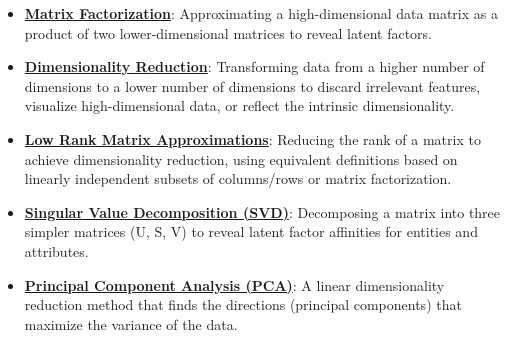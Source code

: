 \documentclass{article}%
\begin{document}
\begin{itemize}[leftmargin=*]%
\item \href{https://purdue.brightspace.com/d2l/common/assets/pdfjs-d2l-dist/1.0.14-legacy/web/viewer.html?file=\%2Fcontent\%2Fenforced\%2F1095467-wl.202510.CS.24300.001\%2F11L2-svd-pca-recommender.pdf\%3Fou\%3D1095467\&lang=en-us\&container=d2l-fileviewer-rendered-pdf\&fullscreen=d2l-fileviewer-rendered-pdf-dialog\&height=667#page=13}{\textbf{Matrix Factorization}}: Approximating a high-dimensional data matrix as a product of two lower-dimensional matrices to reveal latent factors.%
\item \href{https://purdue.brightspace.com/d2l/common/assets/pdfjs-d2l-dist/1.0.14-legacy/web/viewer.html?file=\%2Fcontent\%2Fenforced\%2F1095467-wl.202510.CS.24300.001\%2F11L2-svd-pca-recommender.pdf\%3Fou\%3D1095467\&lang=en-us\&container=d2l-fileviewer-rendered-pdf\&fullscreen=d2l-fileviewer-rendered-pdf-dialog\&height=667#page=8}{\textbf{Dimensionality Reduction}}: Transforming data from a higher number of dimensions to a lower number of dimensions to discard irrelevant features, visualize high-dimensional data, or reflect the intrinsic dimensionality.%
\item \href{https://purdue.brightspace.com/d2l/common/assets/pdfjs-d2l-dist/1.0.14-legacy/web/viewer.html?file=\%2Fcontent\%2Fenforced\%2F1095467-wl.202510.CS.24300.001\%2F11L2-svd-pca-recommender.pdf\%3Fou\%3D1095467\&lang=en-us\&container=d2l-fileviewer-rendered-pdf\&fullscreen=d2l-fileviewer-rendered-pdf-dialog\&height=667#page=9}{\textbf{Low Rank Matrix Approximations}}: Reducing the rank of a matrix to achieve dimensionality reduction, using equivalent definitions based on linearly independent subsets of columns/rows or matrix factorization.%
\item \href{https://purdue.brightspace.com/d2l/common/assets/pdfjs-d2l-dist/1.0.14-legacy/web/viewer.html?file=\%2Fcontent\%2Fenforced\%2F1095467-wl.202510.CS.24300.001\%2F11L2-svd-pca-recommender.pdf\%3Fou\%3D1095467\&lang=en-us\&container=d2l-fileviewer-rendered-pdf\&fullscreen=d2l-fileviewer-rendered-pdf-dialog\&height=667#page=10}{\textbf{Singular Value Decomposition (SVD)}}: Decomposing a matrix into three simpler matrices (U, S, V) to reveal latent factor affinities for entities and attributes.%
\item \href{https://purdue.brightspace.com/d2l/common/assets/pdfjs-d2l-dist/1.0.14-legacy/web/viewer.html?file=\%2Fcontent\%2Fenforced\%2F1095467-wl.202510.CS.24300.001\%2F11L2-svd-pca-recommender.pdf\%3Fou\%3D1095467\&lang=en-us\&container=d2l-fileviewer-rendered-pdf\&fullscreen=d2l-fileviewer-rendered-pdf-dialog\&height=667#page=15}{\textbf{Principal Component Analysis (PCA)}}: A linear dimensionality reduction method that finds the directions (principal components) that maximize the variance of the data.%

\end{itemize}
\end{document}
